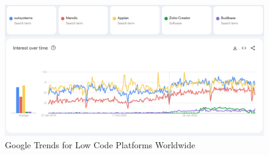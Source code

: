     \begin{figure}[p] %
        \centering
        \includegraphics[width=\textwidth]{imgs/GoogleTrendsLowCodePlatforms.png}
        \caption{Google Trends for Low Code Platforms Worldwide}\label{fig:googletrendslowcodeplatforms-ui}
    \end{figure}


